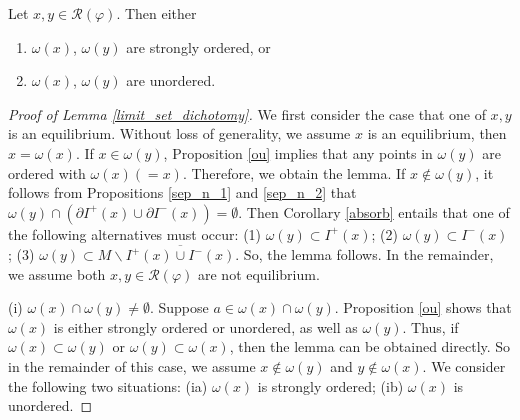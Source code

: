 \documentclass[10pt,a4paper]{amsart}
\begin{document}
\begin{lem}\label{limit_set_dichotomy}
	Let $x,y\in \mathcal{R}(\varphi)$. Then either \begin{enumerate}[{\rm (i)}]
	\item $\omega(x)$, $\omega(y)$ are strongly ordered, or
    \item $\omega(x)$, $\omega(y)$ are unordered.
    \end{enumerate}
\end{lem}

	\begin{proof}[Proof of Lemma \ref{limit_set_dichotomy}]
    We first consider the case that one of $x,y$ is an equilibrium. Without loss of generality, we assume $x$ is an equilibrium, then $x=\omega(x)$. If $x\in \omega(y)$, Proposition \ref{ou} implies that any points in $\omega(y)$ are ordered with $\omega(x)(=x)$. Therefore, we obtain the lemma.
    If $x\notin \omega(y)$, it follows from Propositions \ref{sep_n_1} and \ref{sep_n_2} that $\omega(y)\cap(\partial I^{+}(x)\cup\partial I^{-}(x))=\emptyset$. Then Corollary \ref{absorb} entails that one of the following alternatives must occur: {\rm (1)} $\omega(y)\subset I^{+}(x)$; {\rm (2)} $\omega(y)\subset I^{-}(x)$; {\rm (3)} $\omega(y)\subset M\backslash \overline{I^{+}(x)\cup I^{-}(x)}$.
    So, the lemma follows. In the remainder, we assume both $x,y\in \mathcal{R}(\varphi)$ are not equilibrium.

	(i) $\omega(x)\cap\omega(y)\neq\emptyset$. Suppose $a\in \omega(x)\cap\omega(y)$. Proposition \ref{ou} shows that $\omega(x)$ is either strongly ordered or unordered, as well as $\omega(y)$. Thus, if $\omega(x)\subset\omega(y)$ or $\omega(y)\subset\omega(x)$, then the lemma can be obtained directly. So in the remainder of this case, we assume $x\notin \omega(y)$ and $y\notin \omega(x)$. We consider the following two situations: (ia) $\omega(x)$ is strongly ordered; (ib) $\omega(x)$ is unordered.


\end{proof}
\end{document}
